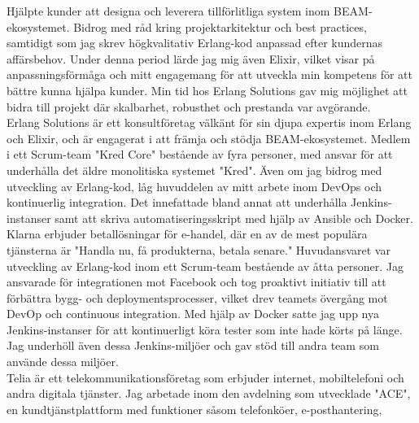 \documentclass[purpleprocv]{procv}
\begin{document}
\begin{procv-twocolumns}
{          {Hjälpte kunder att designa och 
          leverera tillförlitliga system inom BEAM-ekosystemet. Bidrog med råd kring 
          projektarkitektur och best practices, samtidigt som jag skrev högkvalitativ 
          Erlang-kod anpassad efter kundernas affärsbehov. Under denna period lärde 
          jag mig även Elixir, vilket visar på anpassningsförmåga och mitt engagemang 
          för att utveckla min kompetens för att bättre kunna hjälpa kunder. Min tid 
          hos Erlang Solutions gav mig möjlighet att bidra till projekt där skalbarhet, 
          robusthet och prestanda var avgörande.
          \\[3pt]
          Erlang Solutions är ett konsultföretag välkänt för sin djupa expertis inom Erlang 
          och Elixir, och är engagerat i att främja och stödja BEAM-ekosystemet.}
          {Medlem i ett Scrum-team "Kred Core" bestående av fyra personer, med ansvar för att underhålla det äldre monolitiska 
          systemet "Kred". Även om jag bidrog med 
          utveckling av Erlang-kod, låg huvuddelen av mitt arbete inom DevOps och kontinuerlig 
          integration. Det innefattade bland annat att underhålla Jenkins-instanser samt 
          att skriva automatiseringsskript med hjälp av Ansible och Docker.
          \\[3pt]
          Klarna erbjuder betallösningar för e-handel, där en av de mest populära tjänsterna 
          är "Handla nu, få produkterna, betala senare."}
          {Huvudansvaret var utveckling av Erlang-kod inom ett Scrum-team  bestående av åtta personer. Jag ansvarade för 
          integrationen mot Facebook och tog proaktivt initiativ till att förbättra bygg- och 
          deploymentsprocesser, vilket drev teamets övergång mot DevOp och continuous 
          integration. Med hjälp av Docker satte jag upp nya Jenkins-instanser för att 
          kontinuerligt köra tester som inte hade körts på länge. Jag underhöll även dessa 
          Jenkins-miljöer och gav stöd till andra team som använde dessa miljöer.
          \\[3pt]
          Telia är ett telekommunikationsföretag som erbjuder internet, mobiltelefoni och 
          andra digitala tjänster. Jag arbetade inom den avdelning som utvecklade "ACE", 
          en kundtjänstplattform med funktioner såsom telefonköer, e-posthantering, 
}}
\end{procv-twocolumns}
\end{document}
